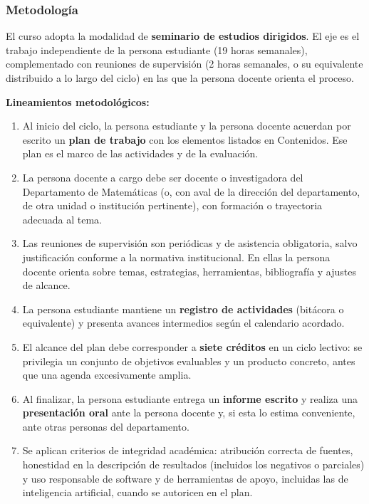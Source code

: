 \begin{refsection}
\subsubsection*{Metodología}

El curso adopta la modalidad de \textbf{seminario de estudios dirigidos}. El eje es el trabajo independiente de la persona estudiante (19 horas semanales), complementado con reuniones de supervisión (2 horas semanales, o su equivalente distribuido a lo largo del ciclo) en las que la persona docente orienta el proceso.

\noindent \textbf{Lineamientos metodológicos:}

\begin{enumerate}
    \item Al inicio del ciclo, la persona estudiante y la persona docente acuerdan por escrito un \textbf{plan de trabajo} con los elementos listados en Contenidos. Ese plan es el marco de las actividades y de la evaluación.
    \item La persona docente a cargo debe ser docente o investigadora del Departamento de Matemáticas (o, con aval de la dirección del departamento, de otra unidad o institución pertinente), con formación o trayectoria adecuada al tema.
    \item Las reuniones de supervisión son periódicas y de asistencia obligatoria, salvo justificación conforme a la normativa institucional. En ellas la persona docente orienta sobre temas, estrategias, herramientas, bibliografía y ajustes de alcance.
    \item La persona estudiante mantiene un \textbf{registro de actividades} (bitácora o equivalente) y presenta avances intermedios según el calendario acordado.
    \item El alcance del plan debe corresponder a \textbf{siete créditos} en un ciclo lectivo: se privilegia un conjunto de objetivos evaluables y un producto concreto, antes que una agenda excesivamente amplia.
    \item Al finalizar, la persona estudiante entrega un \textbf{informe escrito} y realiza una \textbf{presentación oral} ante la persona docente y, si esta lo estima conveniente, ante otras personas del departamento.
    \item Se aplican criterios de integridad académica: atribución correcta de fuentes, honestidad en la descripción de resultados (incluidos los negativos o parciales) y uso responsable de software y de herramientas de apoyo, incluidas las de inteligencia artificial, cuando se autoricen en el plan.
\end{enumerate}


\end{refsection}
